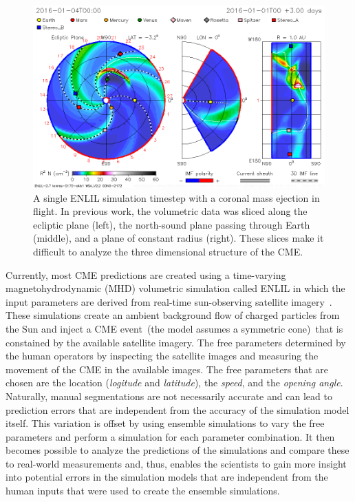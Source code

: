\begin{figure}
\includegraphics[width=\textwidth]{figures/contributions/spaceweather/enlil.png}
\caption{A single ENLIL simulation timestep with a coronal mass ejection in flight.  In previous work, the volumetric data was sliced along the ecliptic plane (left), the north-sound plane passing through Earth (middle), and a plane of constant radius (right).  These slices make it difficult to analyze the three dimensional structure of the CME.}
\label{contributions:astro:spaceweather:enlil}
\end{figure}

Currently, most CME predictions are created using a time-varying magnetohydrodynamic (MHD) volumetric simulation called ENLIL in which the input parameters are derived from real-time sun-observing satellite imagery~\cite{mays2015ensemble}.  These simulations create an ambient background flow of charged particles from the Sun and inject a CME event~(the model assumes a symmetric cone)~that is constained by the available satellite imagery.  The free parameters determined by the human operators by inspecting the satellite images and measuring the movement of the CME in the available images.  The free parameters that are chosen are the location (\emph{logitude} and \emph{latitude}), the \emph{speed}, and the \emph{opening angle}.  Naturally, manual segmentations are not necessarily accurate and can lead to prediction errors that are independent from the accuracy of the simulation model itself.  This variation is offset by using ensemble simulations to vary the free parameters and perform a simulation for each parameter combination.  It then becomes possible to analyze the predictions of the simulations and compare these to real-world measurements and, thus, enables the scientists to gain more insight into potential errors in the simulation models that are independent from the human inputs that were used to create the ensemble simulations.

